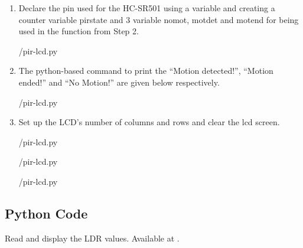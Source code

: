 \begin{enumerate}
  \item  Declare the pin used for the HC-SR501 using a variable and creating a counter variable pirstate and 3 variable nomot, motdet and motend for being used in the function from Step 2.
        
        {\LocLDRpycode/pir-lcd.py} 
 \item The python-based command to print the “Motion detected!”, “Motion ended!” and “No Motion!” are given below respectively.
        
	{\LocLDRpycode/pir-lcd.py} 
 \item Set up the LCD's number of columns and rows and clear the lcd screen.
        
	{\LocLDRpycode/pir-lcd.py}
	
	{\LocLDRpycode/pir-lcd.py}
	
        {\LocLDRpycode/pir-lcd.py} 

\end{enumerate}



\subsection{Python Code}
\label{sec:ldr-python-code}

\begin{pycode}
  {Read and display the LDR values.  Available at
    .}
  \label{py:ldr-read}
  
\end{pycode}


